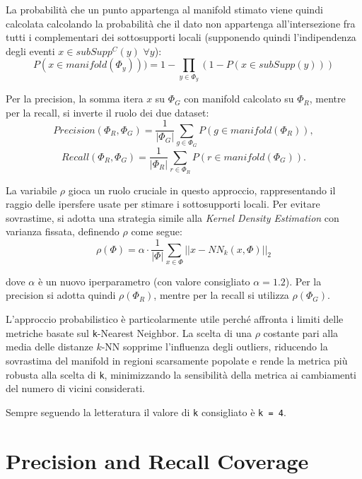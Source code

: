 La probabilità che un punto appartenga al manifold stimato viene quindi calcolata calcolando la probabilità che il dato non appartenga all'intersezione fra tutti i complementari dei sottosupporti locali
(supponendo quindi l'indipendenza degli eventi \(x \in subSupp^C(y)\) \(\forall y\)):
\begin{equation}
    P(x \in manifold(\Phi_y))) = 1 - \prod_{y \in \Phi_y} (1 - P(x \in subSupp(y)))
\end{equation}

Per la precision, la somma itera \(x\) su \(\Phi_G\) con manifold calcolato su \(\Phi_R\), mentre per la recall, si inverte il ruolo dei due dataset:
\begin{equation}
    Precision(\Phi_R, \Phi_G) = \frac{1}{|\Phi_G|} \sum_{g \in \Phi_G} P(g \in manifold(\Phi_R)),
\end{equation}
\begin{equation}
    Recall(\Phi_R, \Phi_G) = \frac{1}{|\Phi_R|} \sum_{r \in \Phi_R} P(r \in manifold(\Phi_G)).
\end{equation}

La variabile \(\rho\) gioca un ruolo cruciale in questo approccio, rappresentando il raggio delle ipersfere usate per stimare i sottosupporti locali. Per evitare sovrastime, si adotta una strategia simile alla \textit{Kernel Density Estimation} con varianza fissata, definendo \(\rho\) come segue:  
\begin{equation}
    \rho(\Phi) = \alpha \cdot \frac{1}{|\Phi|} \sum_{x \in \Phi} ||x - NN_k(x, \Phi)||_2
\end{equation}

dove \(\alpha\) è un nuovo iperparametro (con valore consigliato \(\alpha = 1.2\)). Per la precision si adotta quindi \(\rho(\Phi_R)\), mentre per la recall si utilizza \(\rho(\Phi_G)\).

L'approccio probabilistico è particolarmente utile perché affronta i limiti delle metriche basate sul \texttt{k}-Nearest Neighbor. La scelta di una \(\rho\) costante pari alla media delle distanze \(k\)-NN sopprime l’influenza degli outliers, riducendo la sovrastima del manifold in regioni scarsamente popolate 
e rende la metrica più robusta alla scelta di \texttt{k}, minimizzando la sensibilità della metrica ai cambiamenti del numero di vicini considerati.  

Sempre seguendo la letteratura il valore di \texttt{k} consigliato è \texttt{k = 4}.

\section{Precision and Recall Coverage}
\label{sec:precision-and-recall-coverage}

